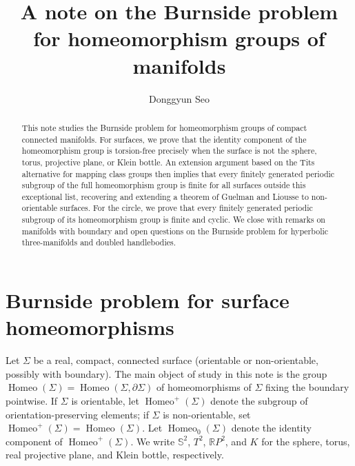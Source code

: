 \documentclass[12pt,a4paper]{amsart}
\numberwithin{equation}{section}
\DeclareMathOperator{\Homeo}{Homeo}
\theoremstyle{plain}
\theoremstyle{definition}
\theoremstyle{remark}
\begin{document}
\title[A note on the Burnside problem for $\Homeo(M)$]{A note on the Burnside problem for homeomorphism groups of manifolds}
	
\author{Donggyun Seo}
\address{Institute of Mathematical Sciences \\ Chungnam National University \\ Daejeon, South Korea}

\begin{abstract}
    This note studies the Burnside problem for homeomorphism groups of compact connected manifolds.
    For surfaces, we prove that the identity component of the homeomorphism group is torsion-free precisely when the surface is not the sphere, torus, projective plane, or Klein bottle.
    An extension argument based on the Tits alternative for mapping class groups then implies that every finitely generated periodic subgroup of the full homeomorphism group is finite for all surfaces outside this exceptional list, recovering and extending a theorem of Guelman and Liousse to non-orientable surfaces.
    For the circle, we prove that every finitely generated periodic subgroup of its homeomorphism group is finite and cyclic.
    We close with remarks on manifolds with boundary and open questions on the Burnside problem for hyperbolic three-manifolds and doubled handlebodies.
\end{abstract}

\maketitle

\section*{Burnside problem for surface homeomorphisms}

Let $\Sigma$ be a real, compact, connected surface (orientable or non-orientable, possibly with boundary).
The main object of study in this note is the group $\Homeo(\Sigma) = \Homeo(\Sigma, \partial\Sigma)$ of homeomorphisms of $\Sigma$ fixing the boundary pointwise.
If $\Sigma$ is orientable, let $\Homeo^+(\Sigma)$ denote the subgroup of orientation-preserving elements; if $\Sigma$ is non-orientable, set $\Homeo^+(\Sigma) = \Homeo(\Sigma)$.
Let $\Homeo_0(\Sigma)$ denote the identity component of $\Homeo^+(\Sigma)$.
We write $\mathbb{S}^2$, $T^2$, $\mathbb{R}P^2$, and $K$ for the sphere, torus, real projective plane, and Klein bottle, respectively.
\end{document}
